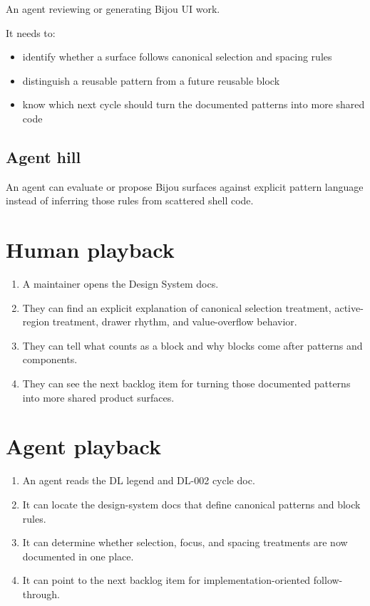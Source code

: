 An agent reviewing or generating Bijou UI work.

It needs to:

\begin{itemize}
\tightlist
\item
  identify whether a surface follows canonical selection and spacing rules
\item
  distinguish a reusable pattern from a future reusable block
\item
  know which next cycle should turn the documented patterns into more shared code
\end{itemize}

\subsection{Agent hill}\label{record-169-agent-hill}

An agent can evaluate or propose Bijou surfaces against explicit pattern language instead of inferring those rules from scattered shell code.

\section{Human playback}\label{record-169-human-playback}

\begin{enumerate}
\def\labelenumi{\arabic{enumi}.}
\tightlist
\item
  A maintainer opens the Design System docs.
\item
  They can find an explicit explanation of canonical selection treatment, active-region treatment, drawer rhythm, and value-overflow behavior.
\item
  They can tell what counts as a block and why blocks come after patterns and components.
\item
  They can see the next backlog item for turning those documented patterns into more shared product surfaces.
\end{enumerate}

\section{Agent playback}\label{record-169-agent-playback}

\begin{enumerate}
\def\labelenumi{\arabic{enumi}.}
\tightlist
\item
  An agent reads the DL legend and DL-002 cycle doc.
\item
  It can locate the design-system docs that define canonical patterns and block rules.
\item
  It can determine whether selection, focus, and spacing treatments are now documented in one place.
\item
  It can point to the next backlog item for implementation-oriented follow-through.
\end{enumerate}

